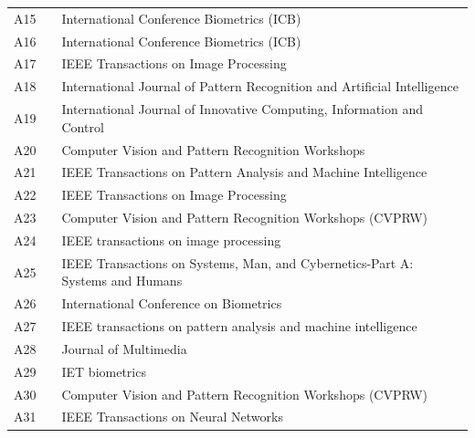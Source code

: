 \begin{quadro}[H]
{\begin{tabular}{cll}
A15 & \cite{[17]alyuz2012robust}  & International Conference Biometrics (ICB)\\
A16 & \cite{[18]zhu2012discriminant} & International Conference Biometrics (ICB)\\
A17 & \cite{[19]song2012three} & IEEE Transactions on Image Processing\\
A18 & \cite{[20]shermina2012recognition}  & International Journal of Pattern Recognition and Artificial Intelligence\\
A19 & \cite{[22]chiang2011recognizing}  & International Journal of Innovative Computing, Information and Control\\
A20 & \cite{[23]eum2011face} & Computer Vision and Pattern Recognition Workshops \\
A21 & \cite{[24]passalis2011using}& IEEE Transactions on Pattern Analysis and Machine Intelligence\\
A22 & \cite{[25]deng2011graph}   & IEEE Transactions on Image Processing\\
A23 & \cite{[26]storer2010occlusion}  & Computer Vision and Pattern Recognition Workshops (CVPRW)\\
A24& \cite{[27]yan2010misalignment}& IEEE transactions on image processing\\
A25 & \cite{[28]de2010faro}& IEEE Transactions on Systems, Man, and Cybernetics-Part A: Systems and Humans\\
A26 & \cite{[31]su2009multi}  & International Conference on Biometrics\\
A27 & \cite{[32]wright2009robust}   & IEEE transactions on pattern analysis and machine intelligence\\
A28 & \cite{[34]zhang2006robust}  & Journal of Multimedia\\
A29 & \cite{[36]huang2012subface}  & IET biometrics\\
A30 & \cite{[37]hosoi2012restoring} & Computer Vision and Pattern Recognition Workshops (CVPRW)\\
A31 & \cite{[38]tan2005recognizing}  &IEEE Transactions on Neural Networks\\
\hline
		\end{tabular}
        }
            \label{tab:autores}

\end{quadro}





